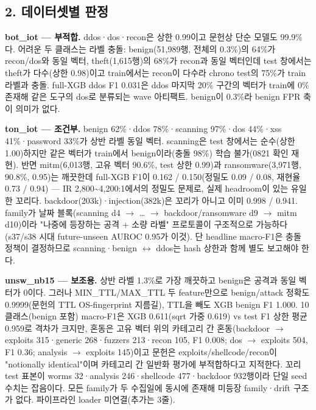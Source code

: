 \subsection{2. 데이터셋별 판정}
\textbf{bot\_\allowbreak{}iot — 부적합.} ddos·dos·recon은 상한 0.99이고 문헌상 단순 모델도 99.9\%다. 어려운 두 클래스는 라벨 충돌: benign(51,989행, 전체의 0.3\%)의 64\%가 recon/\allowbreak{}dos와 동일 벡터, theft(1,615행)의 68\%가 recon과 동일 벡터인데 test 창에서는 theft가 다수(상한 0.98)이고 train에서는 recon이 다수라 chrono test의 75\%가 train 라벨과 충돌. full-XGB ddos F1 0.031은 ddos 마지막 20\% 구간의 벡터가 train에 0\% 존재해 같은 도구의 dos로 분류되는 wave 아티팩트. benign이 0.3\%라 benign FPR 축이 의미가 없다.

\textbf{ton\_\allowbreak{}iot — 조건부.} benign 62\%·ddos 78\%·scanning 97\%·dos 44\%·xss 41\%·password 33\%가 상반 라벨 동일 벡터. scanning은 test 창에서는 순수(상한 1.00)하지만 같은 벡터가 train에서 benign이라(충돌 98\%) 학습 불가(0821 확인 재현). 반면 mitm(6,013행, 고유 벡터 90.6\%, test 상한 0.99)과 ransomware(3,971행, 90.8\%, 0.95)는 깨끗한데 full-XGB F1이 0.162 /\allowbreak{} 0.150(정밀도 0.09 /\allowbreak{} 0.08, 재현율 0.73 /\allowbreak{} 0.94) — IR 2,800\textasciitilde{}4,200:1에서의 정밀도 문제로, 실제 headroom이 있는 유일한 꼬리다. backdoor(203k)·injection(382k)은 꼬리가 아니고 이미 0.998 /\allowbreak{} 0.941. family가 날짜 블록(scanning d4  \ensuremath{\rightarrow}  …  \ensuremath{\rightarrow}  backdoor/\allowbreak{}ransomware d9  \ensuremath{\rightarrow}  mitm d10)이라 "나중에 등장하는 공격 +\allowbreak{} 소량 라벨" 프로토콜이 구조적으로 가능하다(s37/\allowbreak{}s38 시대 future-unseen AUROC 0.95가 이것). 단 headline macro-F1은 충돌 정책이 결정하므로 scanning·benign \ensuremath{\leftrightarrow} ddos는 hash 상한과 함께 별도 보고해야 한다.

\textbf{unsw\_\allowbreak{}nb15 — 보조용.} 상반 라벨 1.3\%로 가장 깨끗하고 benign은 공격과 동일 벡터가 0이다. 그러나 MIN\_\allowbreak{}TTL/\allowbreak{}MAX\_\allowbreak{}TTL 두 feature만으로 benign/\allowbreak{}attack 정확도 0.9999(문헌의 TTL OS-fingerprint 지름길), TTL을 빼도 XGB benign F1 1.000. 10클래스(benign 포함) macro-F1은 XGB 0.611(sqrt 가중 0.619) vs test F1 상한 평균 0.959로 격차가 크지만, 혼동은 고유 벡터 위의 카테고리 간 혼동(backdoor \ensuremath{\rightarrow} exploits 315·generic 268·fuzzers 213·recon 105, F1 0.008; dos \ensuremath{\rightarrow} exploits 504, F1 0.36; analysis \ensuremath{\rightarrow} exploits 145)이고 문헌은 exploits/\allowbreak{}shellcode/\allowbreak{}recon이 "notionally identical"이며 카테고리 간 일반화 평가에 부적합하다고 지적한다. 꼬리 test 표본이 worms 32·analysis 246·shellcode 477·backdoor 932행이라 단일 seed 수치는 잡음이다. 모든 family가 두 수집일에 동시에 존재해 미등장 family·drift 구조가 없다. 파이프라인 loader 미연결(추가는 3줄).

